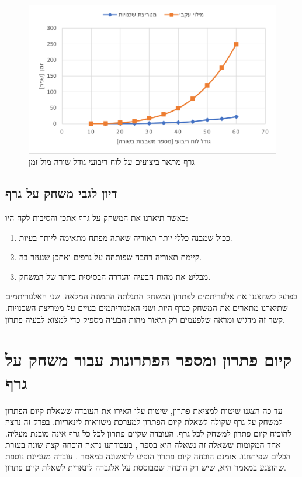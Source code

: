 \documentclass[12pt,leqno]{article}
\theoremstyle{theoremdd}
\begin{document}
\begin{figure}[ht]
    \caption{ 
    גרף מתאר ביצועים על לוח ריבועי גודל שורה מול זמן
    }
    \label{fig:prefofmance_diagram}
    \centering
    \includegraphics{images/benchmark.png}
\end{figure}

\subsection{דיון לגבי משחק על גרף}
כאשר תיארנו את המשחק על גרף אתכן 
והסיבות לקח היו:
\begin{enumerate}
    \item 
    ככול שמבנה כללי יותר תאוריה שאתה מפתח מתאימה ליותר בעיות.
    \item 
    קיימת תאוריה רחבה שפותחה על גרפים ואתכן שנעזר בה.
    \item 
    מבליט את מהות הבעיה והגדרה הבסיסית ביותר של המשחק.
\end{enumerate}
בפועל כשהצגנו את אלגוריתמים לפתרון המשחק 
התגלתה התמונה המלאה.
שני האלגוריתמים שתיארנו מתארים את המשחק כגרף היות ושני האלגוריתמים בנויים על מטריצת השכנויות.
קשר זה מדגיש ומראה שלפעמים רק תיאור מהות הבעיה מספיק כדי למצוא לבעיה פתרון.

\section{קיום פתרון ומספר הפתרונות עבור משחק על גרף}
עד כה הצגנו שיטות למציאת פתרון,
שיטות עלו האירו את העובדה
ששאלת קיום הפתרון למשחק על גרף שקולה לשאלת קיום הפתרון למערכת
משוואות לינאריות.
בפרק זה נרצה להוכיח קיום פתרון למשחק לכל גרף.
העובדה שקיים פתרון לכל כל גרף אינה מובנת מעליה.
אחד המקומות ששאלה זה נשאלה היא בספר 
\cite{B3},
בעבודתנו נראה הוכחה קצת שונה בעזרת הכלים שפיתחנו.
אומנם הוכחה קיום פתרון הופיע לראשונה במאמר 
\cite{Sutner}.
עובדה מעניינת נוספת שהוצגע במאמר היא,
שיש רק הוכחה שמבוססת על אלגברה לינארית
לשאלת קיום פתרון.
\end{document}
